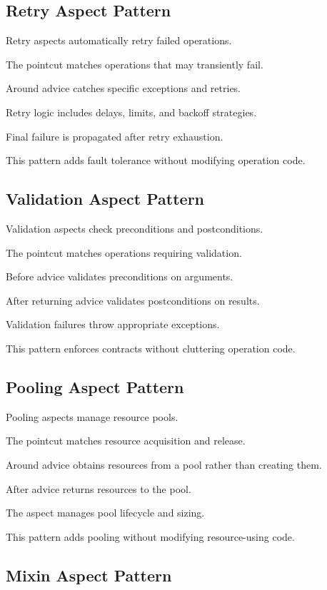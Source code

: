 \documentclass[11pt]{article}
\begin{document}
\subsection{Retry Aspect Pattern}

Retry aspects automatically retry failed operations.

The pointcut matches operations that may transiently fail.

Around advice catches specific exceptions and retries.

Retry logic includes delays, limits, and backoff strategies.

Final failure is propagated after retry exhaustion.

This pattern adds fault tolerance without modifying operation code.

\subsection{Validation Aspect Pattern}

Validation aspects check preconditions and postconditions.

The pointcut matches operations requiring validation.

Before advice validates preconditions on arguments.

After returning advice validates postconditions on results.

Validation failures throw appropriate exceptions.

This pattern enforces contracts without cluttering operation code.

\subsection{Pooling Aspect Pattern}

Pooling aspects manage resource pools.

The pointcut matches resource acquisition and release.

Around advice obtains resources from a pool rather than creating them.

After advice returns resources to the pool.

The aspect manages pool lifecycle and sizing.

This pattern adds pooling without modifying resource-using code.

\subsection{Mixin Aspect Pattern}
\end{document}
